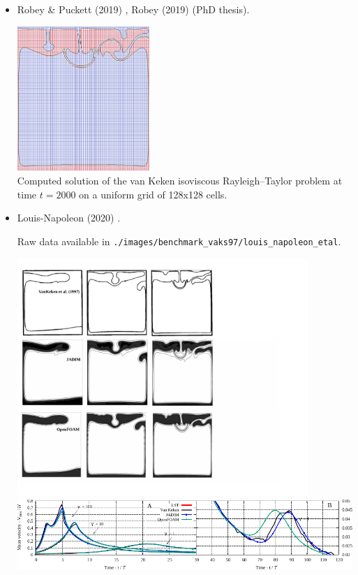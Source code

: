 \begin{itemize}
\item Robey \& Puckett (2019) \cite{ropu19}, Robey (2019) \cite{robe19} (PhD thesis).

\begin{center}
\includegraphics[width=5cm]{images/benchmark_vaks97/ropu19}\\
{\captionfont Computed solution of the van Keken isoviscous Rayleigh–Taylor problem
at time $t = 2000$ on a uniform grid of 128x128 cells. }
\end{center}



\item Louis-Napoleon \etal (2020) \cite{logb20}.

Raw data available in {\tt ./images/benchmark\_vaks97/louis\_napoleon\_etal}.

\begin{center}
\includegraphics[width=11cm]{images/benchmark_vaks97/louis_napoleon_etal/VK1}\\
\includegraphics[width=14cm]{images/benchmark_vaks97/louis_napoleon_etal/VKzoom}
\end{center}


\end{itemize}
